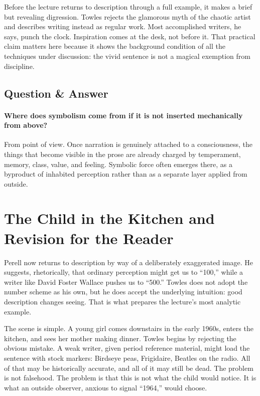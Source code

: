 Before the lecture returns to description through a full example, it makes a brief but revealing digression. Towles rejects the glamorous myth of the chaotic artist and describes writing instead as regular work. Most accomplished writers, he says, punch the clock. Inspiration comes at the desk, not before it. That practical claim matters here because it shows the background condition of all the techniques under discussion: the vivid sentence is not a magical exemption from discipline.

\subsection{Question \& Answer}

\paragraph{Where does symbolism come from if it is not inserted mechanically from above?}

From point of view. Once narration is genuinely attached to a consciousness, the things that become visible in the prose are already charged by temperament, memory, class, value, and feeling. Symbolic force often emerges there, as a byproduct of inhabited perception rather than as a separate layer applied from outside.

\section{The Child in the Kitchen and Revision for the Reader}

Perell now returns to description by way of a deliberately exaggerated image. He suggests, rhetorically, that ordinary perception might get us to ``100,'' while a writer like David Foster Wallace pushes us to ``500.'' Towles does not adopt the number scheme as his own, but he does accept the underlying intuition: good description changes seeing. That is what prepares the lecture's most analytic example.

The scene is simple. A young girl comes downstairs in the early 1960s, enters the kitchen, and sees her mother making dinner. Towles begins by rejecting the obvious mistake. A weak writer, given period reference material, might load the sentence with stock markers: Birdseye peas, Frigidaire, Beatles on the radio. All of that may be historically accurate, and all of it may still be dead. The problem is not falsehood. The problem is that this is not what the child would notice. It is what an outside observer, anxious to signal ``1964,'' would choose.

